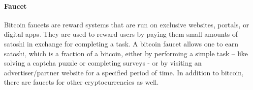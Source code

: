 \paragraph{Faucet}
Bitcoin faucets are reward systems that are run on exclusive websites, portals, or digital apps. They are used to reward users by paying them small amounts of satoshi in exchange for completing a task. A bitcoin faucet allows one to earn satoshi, which is a fraction of a bitcoin, either by performing a simple task – like solving a captcha puzzle or completing surveys - or by visiting an advertiser/partner website for a specified period of time. In addition to bitcoin, there are faucets for other cryptocurrencies as well.   